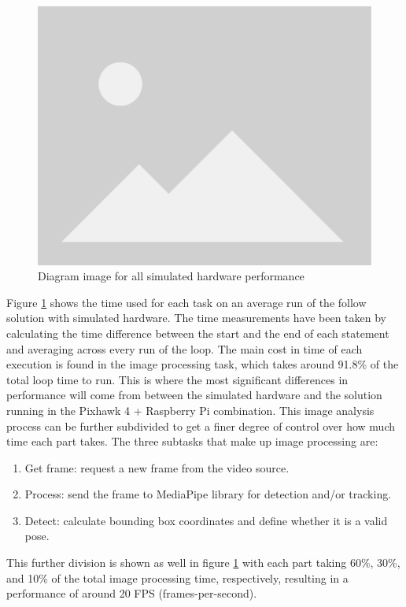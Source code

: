 \begin{figure}
  \centering
  \includegraphics[width=.8\textwidth, keepaspectratio]{img/placeholder.png}
  \caption{Diagram image for all simulated hardware performance}
  \label{fig:perf-sitl-sim}
\end{figure}

Figure \ref{fig:perf-sitl-sim} shows the time used for each task on an average run of the follow solution with simulated hardware.
The time measurements have been taken by calculating the time difference between the start and the end of each statement and averaging across every run of the loop.
The main cost in time of each execution is found in the image processing task, which takes around 91.8\% of the total loop time to run.
This is where the most significant differences in performance will come from between the simulated hardware and the solution running in the Pixhawk 4 + Raspberry Pi combination.
This image analysis process can be further subdivided to get a finer degree of control over how much time each part takes.
The three subtasks that make up image processing are:
\begin{enumerate}
    \item Get frame: request a new frame from the video source.
    \item Process: send the frame to MediaPipe library for detection and/or tracking.
    \item Detect: calculate bounding box coordinates and define whether it is a valid pose.
\end{enumerate}

This further division is shown as well in figure \ref{fig:perf-sitl-sim} with each part taking 60\%, 30\%, and 10\% of the total image processing time, respectively, resulting in a performance of around 20 FPS (frames-per-second).

